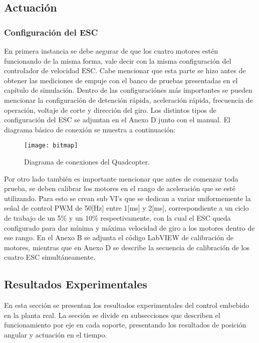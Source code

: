 \documentclass[\main/main.tex]{subfiles}
\begin{document}
\subsection{Actuación}


\subsubsection{Configuración del ESC}

En primera instancia se debe aegurar de que los cuatro motores estén
funcionando de la misma forma, vale decir con la misma configuración
del controlador de velocidad ESC. Cabe mencionar que esta parte se
hizo antes de obtener las mediciones de empuje con el banco de pruebas
presentadas en el capítulo de simulación. Dentro de las configuraciónes
más importantes se pueden mencionar la configuración de detención
rápida, aceleración rápida, frecuencia de operación, voltaje de corte
y dirección del giro. Los distintos tipos de configuración del ESC
se adjuntan en el Anexo D junto con el manual. El diagrama
básico de conexión se muestra a continuación:

\begin{figure}[H]
\noindent \begin{centering}
\texttt{[image: bitmap]}
\par\end{centering}
\caption{Diagrama de conexiones del Quadcopter.}
\end{figure}

Por otro lado también es importante mencionar que antes de comenzar
toda prueba, se deben calibrar los motores en el rango de aceleración
que se esté utilizando. Para esto se crean sub VI's que se dedican
a variar uniformemente la señal de control PWM de 50{[}Hz{]} entre
1{[}ms{]} y 2{[}ms{]}, correspondiente a un ciclo de trabajo de un
5\% y un 10\% respectivamente, con la cual el ESC queda configurado
para dar mínima y máxima velocidad de giro a los motores dentro de
ese rango. En el Anexo B se adjunta el código LabVIEW de calibración de motores, mientras que en Anexo D se describe la secuencia de calibración de los cuatro ESC simultáneamente. 

\subsection{Resultados Experimentales}

En esta sección se presentan los resultados experimentales del control
embebido en la planta real. La sección se divide en subsecciones que
describen el funcionamiento por eje en cada soporte, presentando los
resultados de posición angular y actuación en el tiempo. 
\end{document}
